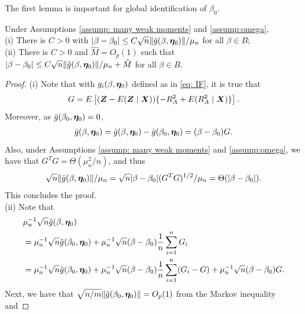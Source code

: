 \documentclass[12pt]{article}
\begin{document}
{%
The first lemma is important for global identification of $\beta_0$. 
\begin{lemma}\label{lemma: cond} Under Assumptions \ref{assump: many weak moments} and \ref{assump:omega}, \\
    (i) There is $C>0$ with $|\beta- \beta_0|\leq C\sqrt{n} \|\bar g(\beta, \bm \eta_0)\| /\mu_n$ for all $\beta\in B$;\\
    (ii) There is $C>0$ and $\hat M=O_p(1)$ such that $|\beta-\beta_0|\leq C\sqrt{n}\|\hat g(\beta, \bm \eta_0) \| /\mu_n+ \hat M$ for all $\beta\in B$.
\end{lemma}
\begin{proof}
(i) Note that with $g_i(\beta, \bm \eta_0)$ defined as in \eqref{eq: IF}, it is true that 
\[
G=E\left[(\bm{Z} - E(\bm{Z}\mid \bm{X})  ) \{-R_A^2 +  E(R_A^2\mid \bm{X})  \}\right].
\]
Moreover, as $\bar g(\beta_0, \bm \eta_0)= 0 $, 
\begin{align}
\bar g(\beta, \bm \eta_0)=\bar g(\beta, \bm \eta_0)- \bar g(\beta_0, \bm \eta_0)= (\beta- \beta_0) G.\label{eq: g bar}    
\end{align}
Also, under Assumptions \ref{assump: many weak moments} and  \ref{assump:omega}, we have that $G^T G = \Theta(\mu_n^2/n)$, and thus
\begin{align*}
    \sqrt{n} \|\bar g(\beta, \bm \eta_0) \| /\mu_n= \sqrt{n} |\beta- \beta_0| (G^T G)^{1/2} /\mu_n = \Theta(|\beta-\beta_0|).
\end{align*}
This concludes the proof. \\
(ii) Note that 
\begin{align}
  &\mu_n^{-1} \sqrt{n}  \hat g(\beta, \bm \eta_0) \label{eq: g hat}\\
  &=    \mu_n^{-1} \sqrt{n} \hat g(\beta_0, \bm \eta_0) + \mu_n^{-1} \sqrt{n}(\beta- \beta_0) \frac{1}{n} \sum_{i=1}^n G_i\nonumber\\
  & =    \mu_n^{-1} \sqrt{n} \hat g(\beta_0, \bm \eta_0) + \mu_n^{-1} \sqrt{n}(\beta- \beta_0) \frac{1}{n} \sum_{i=1}^n (G_i-G) + \mu_n^{-1}\sqrt{n} (\beta-\beta_0) G \nonumber.
\end{align}
Next, we have that $\sqrt{n/m} \|\hat g (\beta_0, \bm \eta_0)\|=O_p(1)$ from the Markov inequality and 

\end{proof}}
\end{document}
